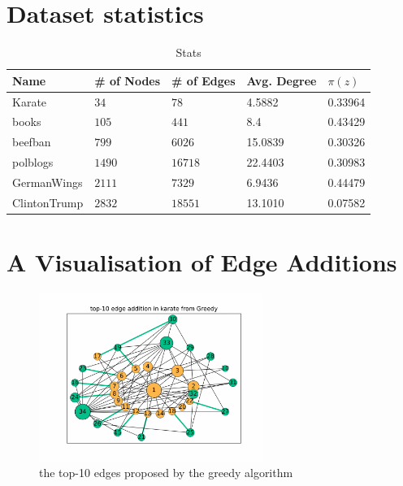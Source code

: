 \section{Dataset statistics}
\label{sec:stats}

\begin{table}[H]
 \centering
 \caption{Stats}
 \label{tab:statistics}
 \begin{tabular}{| l || l | l | l | l |}
 \hline
  Name & \# of Nodes & \# of Edges & Avg. Degree & $\pi(z)$\\
  \hline
  \hline
  Karate & $34$ & $78$ & 4.5882 &  0.33964\\
  \hline
    books & $105$ & $441$ & 8.4 &  0.43429\\
  \hline
    beefban & $799$ & $6026$ & 15.0839 &  0.30326\\
  \hline
  polblogs & $1490$ & $16718$ & 22.4403 &  0.30983\\
  \hline
  GermanWings & $2111$ & $7329$ & 6.9436 &  0.44479\\
  \hline
  ClintonTrump & $2832$ & $18551$ & 13.1010 &  0.07582\\
  \hline
 \end{tabular}
 \end{table}
 
\vspace{20pt}
\clearpage

\section{A Visualisation of Edge Additions}
\label{sec:vis}

\begin{figure}[!htbp]
	\centering
	\captionsetup{justification=centering,margin=2cm}
	\includegraphics[width=0.65\textwidth]{Figures/top-10_karate_greedy}
	\caption{the top-10 edges proposed by the greedy algorithm}
	\label{fig:top-10-karate}
\end{figure}

